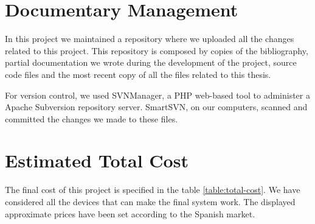 \bigskip
\section{Documentary Management}
In this project we maintained a repository where we uploaded all the changes related to this project. This repository is composed
by copies of the bibliography, partial documentation we wrote during the development of the project, source code files and the most
recent copy of all the files related to this thesis.

For version control, we used SVNManager, a PHP web-based tool to administer a Apache Subversion repository server. SmartSVN, on
our computers, scanned and committed the changes we made to these files.

\bigskip
\section{Estimated Total Cost}

The final cost of this project is specified in the table \ref{table:total-cost}. We have considered all the devices that can make
the final system work. The displayed approximate prices have been set according to the Spanish market.

\begin{table}[]
	\centering
	\caption{Estimated total cost of this project}
	\label{table:total-cost}
\end{table}

